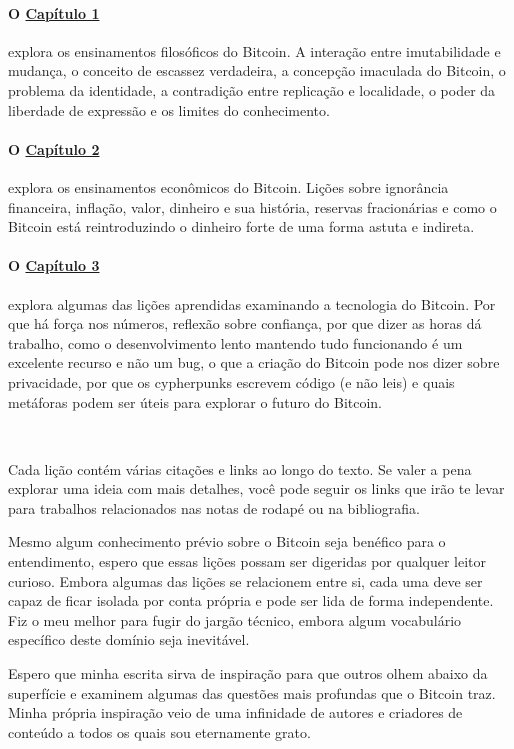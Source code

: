 \paragraph{O \hyperref[ch:philosophy]{Capítulo 1}}{explora os ensinamentos filosóficos do Bitcoin. A interação entre imutabilidade e mudança, o conceito de escassez verdadeira, a concepção imaculada do Bitcoin, o problema da identidade, a contradição entre replicação e localidade, o poder da liberdade de expressão e os limites do conhecimento. }

\paragraph{O \hyperref[ch:economics]{Capítulo 2}}{explora os ensinamentos econômicos do Bitcoin. Lições sobre ignorância financeira, inflação, valor, dinheiro e sua história, reservas fracionárias e como o Bitcoin está reintroduzindo o dinheiro forte de uma forma astuta e indireta.}

\paragraph{O \hyperref[ch:technology]{Capítulo 3}}{explora algumas das lições aprendidas examinando a tecnologia do Bitcoin. Por que há força nos números, reflexão sobre confiança, por que dizer as horas dá trabalho, como o desenvolvimento lento mantendo tudo funcionando é um excelente recurso e não um bug, o que a criação do Bitcoin pode nos dizer sobre privacidade, por que os cypherpunks escrevem código (e não leis) e quais metáforas podem ser úteis para explorar o futuro do Bitcoin.}

~

Cada lição contém várias citações e links ao longo do texto. Se valer a pena explorar uma ideia com mais detalhes, você pode seguir os links que irão te levar para trabalhos relacionados nas notas de rodapé ou na bibliografia.

Mesmo algum conhecimento prévio sobre o Bitcoin seja benéfico para o entendimento, espero que essas lições possam ser digeridas por qualquer leitor curioso. Embora algumas das lições se relacionem entre si, cada uma deve ser capaz de ficar isolada por conta própria e pode ser lida de forma independente. Fiz o meu melhor para fugir do jargão técnico, embora algum vocabulário específico deste domínio seja inevitável.

Espero que minha escrita sirva de inspiração para que outros olhem abaixo da superfície e examinem algumas das questões mais profundas que o Bitcoin traz. Minha própria inspiração veio de uma infinidade de autores e criadores de conteúdo a todos os quais sou eternamente grato.


